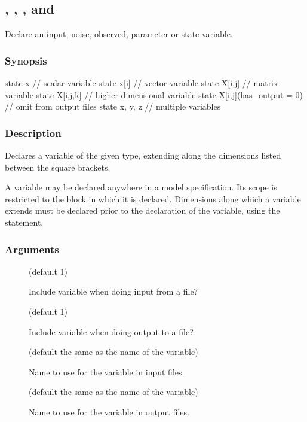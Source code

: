 \subsection{\label{input}, \label{noise}, \label{obs}, \label{param} and \label{state}}

Declare an input, noise, observed, parameter or state variable.

\subsubsection*{Synopsis\label{var_Synopsis}}

\begin{bicode}
state x                       // scalar variable
state x[i]                    // vector variable
state X[i,j]                  // matrix variable
state X[i,j,k]                // higher-dimensional variable
state X[i,j](has_output = 0)  // omit from output files
state x, y, z                 // multiple variables
\end{bicode}

\subsubsection*{Description\label{var_Description}}

Declares a variable of the given type, extending along the dimensions listed
between the square brackets.

A variable may be declared anywhere in a model
specification. Its scope is restricted to the block in which it is
declared. Dimensions along which a variable extends must be
declared prior to the declaration of the variable, using the 
statement.

\subsubsection*{Arguments\label{var_Arguments}}

\begin{description}
\item[] (default 1)

Include variable when doing input from a file?

\item[] (default 1)

Include variable when doing output to a file?

\item[] (default the same as the name of the
  variable)

Name to use for the variable in input files.

\item[] (default the same as the name of the
  variable)

Name to use for the variable in output files.

\end{description}

